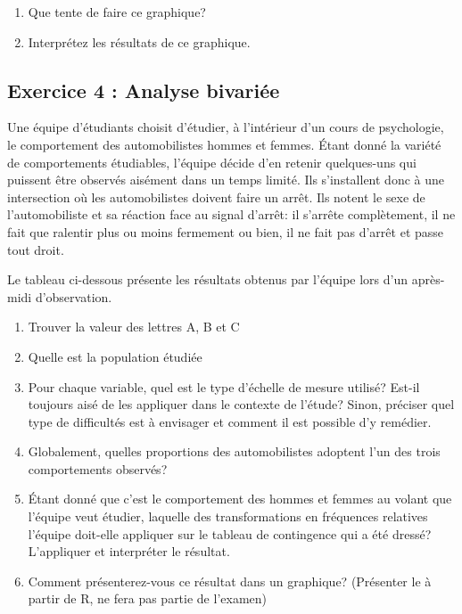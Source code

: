 \documentclass[]{article}
\begin{document}
\begin{enumerate}
\def\labelenumi{\arabic{enumi}.}
\item
  Que tente de faire ce graphique?
\item
  Interprétez les résultats de ce graphique.
\end{enumerate}

\subsection{Exercice 4 : Analyse
bivariée}\label{exercice-4-analyse-bivariee}

Une équipe d'étudiants choisit d'étudier, à l'intérieur d'un cours de
psychologie, le comportement des automobilistes hommes et femmes. Étant
donné la variété de comportements étudiables, l'équipe décide d'en
retenir quelques-uns qui puissent être observés aisément dans un temps
limité. Ils s'installent donc à une intersection où les automobilistes
doivent faire un arrêt. Ils notent le sexe de l'automobiliste et sa
réaction face au signal d'arrêt: il s'arrête complètement, il ne fait
que ralentir plus ou moins fermement ou bien, il ne fait pas d'arrêt et
passe tout droit.

Le tableau ci-dessous présente les résultats obtenus par l'équipe lors
d'un après-midi d'observation.

\begin{enumerate}
\def\labelenumi{\arabic{enumi}.}
\item
  Trouver la valeur des lettres A, B et C
\item
  Quelle est la population étudiée
\item
  Pour chaque variable, quel est le type d'échelle de mesure utilisé?
  Est-il toujours aisé de les appliquer dans le contexte de l'étude?
  Sinon, préciser quel type de difficultés est à envisager et comment il
  est possible d'y remédier.
\item
  Globalement, quelles proportions des automobilistes adoptent l'un des
  trois comportements observés?
\item
  Étant donné que c'est le comportement des hommes et femmes au volant
  que l'équipe veut étudier, laquelle des transformations en fréquences
  relatives l'équipe doit-elle appliquer sur le tableau de contingence
  qui a été dressé? L'appliquer et interpréter le résultat.
\item
  Comment présenterez-vous ce résultat dans un graphique? (Présenter le
  à partir de R, ne fera pas partie de l'examen)
\end{enumerate}
\end{document}

